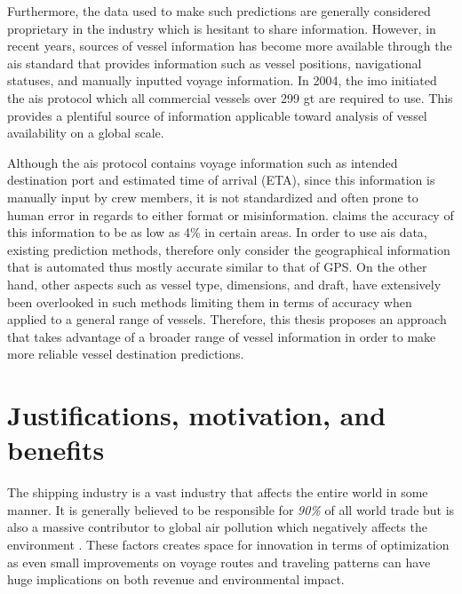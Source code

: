 

Furthermore, the data used to make such predictions are generally considered proprietary in the industry which is hesitant to share information. However, in recent years, sources of vessel information has become more available through the \acrshort{ais} standard that provides information such as vessel positions, navigational statuses, and manually inputted voyage information. In 2004, the \acrfull{imo} initiated the \acrshort{ais} protocol which all commercial vessels over 299 \acrfull{gt} are required to use. This provides a plentiful source of information applicable toward analysis of vessel availability on a global scale.

Although the \acrshort{ais} protocol contains voyage information such as intended destination port and estimated time of arrival (ETA), since this information is manually input by crew members, it is not standardized and often prone to human error in regards to either format or misinformation. \cite{mestl2016} claims the accuracy of this information to be as low as 4\% in certain areas. In order to use \acrshort{ais} data, existing prediction methods, therefore only consider the geographical information that is automated thus mostly accurate similar to that of GPS\@. On the other hand, other aspects such as vessel type, dimensions, and draft, have extensively been overlooked in such methods limiting them in terms of accuracy when applied to a general range of vessels. Therefore, this thesis proposes an approach that takes advantage of a broader range of vessel information in order to make more reliable vessel destination predictions.

\section{Justifications, motivation, and benefits}
\label{section:justifications_motivations_benefits}

The shipping industry is a vast industry that affects the entire world in some manner. It is generally believed to be responsible for \textit{90\%} of all world trade \parencite{grote2016} but is also a massive contributor to global air pollution which negatively affects the environment \parencite{zheng2016:online}. These factors creates space for innovation in terms of optimization as even small improvements on voyage routes and traveling patterns can have huge implications on both revenue and environmental impact.

